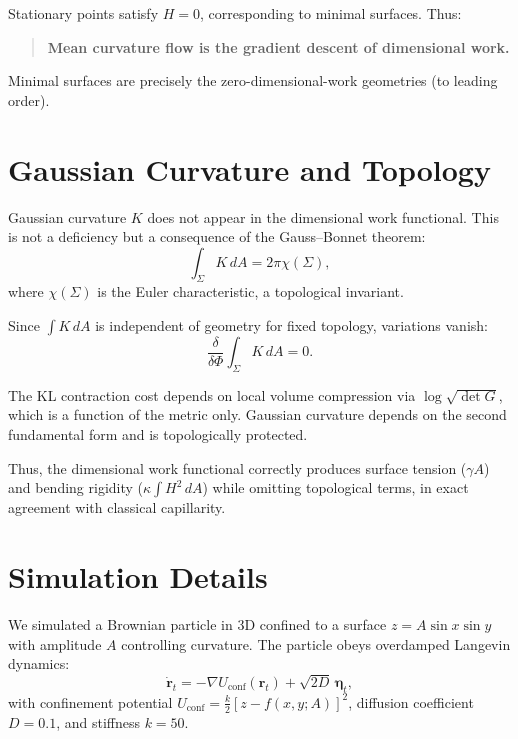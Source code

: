 \documentclass[aps,pre,twocolumn,superscriptaddress,floatfix]{revtex4-2}
\begin{document}
Stationary points satisfy $H = 0$, corresponding to minimal surfaces. Thus:
\begin{quote}
\textbf{Mean curvature flow is the gradient descent of dimensional work.}
\end{quote}

Minimal surfaces are precisely the zero-dimensional-work geometries (to leading order).

\section{Gaussian Curvature and Topology}
\label{app:gauss}

Gaussian curvature $K$ does not appear in the dimensional work functional. This is not a deficiency but a consequence of the Gauss--Bonnet theorem:
\begin{equation}
\int_\Sigma K\,dA = 2\pi\chi(\Sigma),
\end{equation}
where $\chi(\Sigma)$ is the Euler characteristic, a topological invariant.

Since $\int K\,dA$ is independent of geometry for fixed topology, variations vanish:
\begin{equation}
\frac{\delta}{\delta\Phi}\int_\Sigma K\,dA = 0.
\end{equation}

The KL contraction cost depends on local volume compression via $\log\sqrt{\det G}$, which is a function of the metric only. Gaussian curvature depends on the second fundamental form and is topologically protected.

Thus, the dimensional work functional correctly produces surface tension ($\gamma A$) and bending rigidity ($\kappa\int H^2\,dA$) while omitting topological terms, in exact agreement with classical capillarity.

\section{Simulation Details}
\label{app:sim}

We simulated a Brownian particle in 3D confined to a surface $z = A\sin x\sin y$ with amplitude $A$ controlling curvature. The particle obeys overdamped Langevin dynamics:
\begin{equation}
\dot{\mathbf{r}}_t = -\nabla U_{\mathrm{conf}}(\mathbf{r}_t) + \sqrt{2D}\,\bm{\eta}_t,
\end{equation}
with confinement potential $U_{\mathrm{conf}} = \frac{k}{2}[z - f(x,y;A)]^2$, diffusion coefficient $D = 0.1$, and stiffness $k = 50$.
\end{document}
